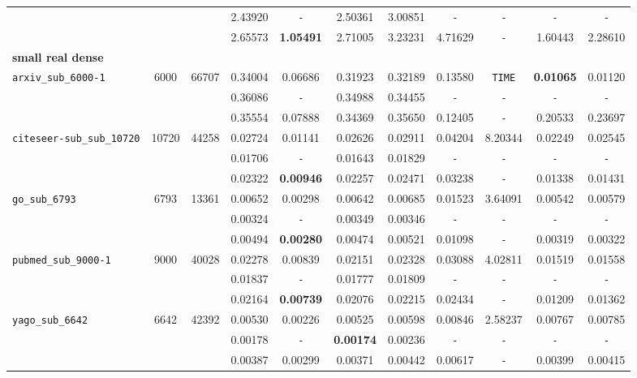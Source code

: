 {\begin{tabular}{ l c c | c c c c c c c c }
 &  &  & 2.43920 & \verb|-| & 2.50361 & 3.00851 & \verb|-| & \verb|-| & \verb|-| & \verb|-| \\
 &  &  & 2.65573 & \textbf{1.05491} & 2.71005 & 3.23231 & 4.71629 & \verb|-| & 1.60443 & 2.28610 \\
\hline
\multicolumn{11}{l}{\textbf{small real dense}} \\
\hline
\verb|arxiv_sub_6000-1| & 6000 & 66707 & 0.34004 & 0.06686 & 0.31923 & 0.32189 & 0.13580 & \verb|TIME| & \textbf{0.01065} & 0.01120 \\
 &  &  & 0.36086 & \verb|-| & 0.34988 & 0.34455 & \verb|-| & \verb|-| & \verb|-| & \verb|-| \\
 &  &  & 0.35554 & 0.07888 & 0.34369 & 0.35650 & 0.12405 & \verb|-| & 0.20533 & 0.23697 \\
\hline
\verb|citeseer-sub_sub_10720| & 10720 & 44258 & 0.02724 & 0.01141 & 0.02626 & 0.02911 & 0.04204 & 8.20344 & 0.02249 & 0.02545 \\
 &  &  & 0.01706 & \verb|-| & 0.01643 & 0.01829 & \verb|-| & \verb|-| & \verb|-| & \verb|-| \\
 &  &  & 0.02322 & \textbf{0.00946} & 0.02257 & 0.02471 & 0.03238 & \verb|-| & 0.01338 & 0.01431 \\
\hline
\verb|go_sub_6793| & 6793 & 13361 & 0.00652 & 0.00298 & 0.00642 & 0.00685 & 0.01523 & 3.64091 & 0.00542 & 0.00579 \\
 &  &  & 0.00324 & \verb|-| & 0.00349 & 0.00346 & \verb|-| & \verb|-| & \verb|-| & \verb|-| \\
 &  &  & 0.00494 & \textbf{0.00280} & 0.00474 & 0.00521 & 0.01098 & \verb|-| & 0.00319 & 0.00322 \\
\hline
\verb|pubmed_sub_9000-1| & 9000 & 40028 & 0.02278 & 0.00839 & 0.02151 & 0.02328 & 0.03088 & 4.02811 & 0.01519 & 0.01558 \\
 &  &  & 0.01837 & \verb|-| & 0.01777 & 0.01809 & \verb|-| & \verb|-| & \verb|-| & \verb|-| \\
 &  &  & 0.02164 & \textbf{0.00739} & 0.02076 & 0.02215 & 0.02434 & \verb|-| & 0.01209 & 0.01362 \\
\hline
\verb|yago_sub_6642| & 6642 & 42392 & 0.00530 & 0.00226 & 0.00525 & 0.00598 & 0.00846 & 2.58237 & 0.00767 & 0.00785 \\
 &  &  & 0.00178 & \verb|-| & \textbf{0.00174} & 0.00236 & \verb|-| & \verb|-| & \verb|-| & \verb|-| \\
 &  &  & 0.00387 & 0.00299 & 0.00371 & 0.00442 & 0.00617 & \verb|-| & 0.00399 & 0.00415 \\
\hline
  \end{tabular}
}


